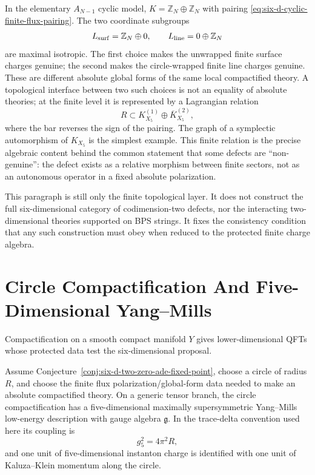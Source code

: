 In the elementary \(A_{N-1}\) cyclic model, \(K=\mathbb Z_N\oplus\mathbb Z_N\)
with pairing \eqref{eq:six-d-cyclic-finite-flux-pairing}.  The two coordinate
subgroups
\[
  L_{\rm surf}=\mathbb Z_N\oplus0,\qquad
  L_{\rm line}=0\oplus\mathbb Z_N
\]
are maximal isotropic.  The first choice makes the unwrapped finite surface
charges genuine; the second makes the circle-wrapped finite line charges
genuine.  These are different absolute global forms of the same local
compactified theory.  A topological interface between two such choices is
not an equality of absolute theories; at the finite level it is represented
by a Lagrangian relation
\[
  R\subset K_{X_5}^{(1)}\oplus \overline{K}_{X_5}^{(2)},
\]
where the bar reverses the sign of the pairing.  The graph of a symplectic
automorphism of \(K_{X_5}\) is the simplest example.  This finite relation
is the precise algebraic content behind the common statement that some
defects are ``non-genuine'': the defect exists as a relative morphism between
finite sectors, not as an autonomous operator in a fixed absolute
polarization.

This paragraph is still only the finite topological layer.  It does not
construct the full six-dimensional category of codimension-two defects, nor
the interacting two-dimensional theories supported on BPS strings.  It fixes
the consistency condition that any such construction must obey when reduced
to the protected finite charge algebra.

\section{Circle Compactification And Five-Dimensional Yang--Mills}

Compactification on a smooth compact manifold \(Y\) gives lower-dimensional
QFTs whose protected data test the six-dimensional proposal.

\begin{conjecture}
\label{conj:six-d-two-zero-circle-to-5d-msym}
Assume Conjecture~\ref{conj:six-d-two-zero-ade-fixed-point}, choose a circle
of radius \(R\), and choose the finite flux polarization/global-form data
needed to make an absolute compactified theory.  On a generic tensor branch,
the circle compactification has a five-dimensional maximally supersymmetric
Yang--Mills low-energy description with gauge algebra \(\mathfrak g\).  In the
trace-delta convention used here its coupling is
\[
  g_5^2=4\pi^2R,
\]
and one unit of five-dimensional instanton charge is identified with one unit
of Kaluza--Klein momentum along the circle.
\end{conjecture}

